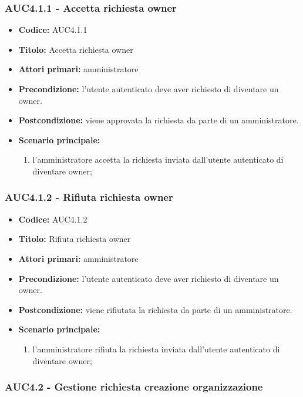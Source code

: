 \documentclass[casi-duso]{subfiles}
\begin{document}
\subsubsection{AUC4.1.1 - Accetta richiesta owner}%
\label{subsub:AUC4.1.1}
\begin{itemize}
  \item \textbf{Codice:} AUC4.1.1
  \item \textbf{Titolo:} Accetta richiesta owner
  \item \textbf{Attori primari:} amministratore
  \item \textbf{Precondizione:} l'utente autenticato deve aver richiesto di diventare un owner.
  \item \textbf{Postcondizione:} viene approvata la richiesta da parte di un amministratore.
  \item \textbf{Scenario principale:}
  \begin{enumerate}
    \item l'amministratore accetta la richiesta inviata dall'utente autenticato di diventare owner;
  \end{enumerate}
\end{itemize}

\subsubsection{AUC4.1.2 - Rifiuta richiesta owner}%
\label{subsub:AUC4.1.2}
\begin{itemize}
  \item \textbf{Codice:} AUC4.1.2
  \item \textbf{Titolo:} Rifiuta richiesta owner
  \item \textbf{Attori primari:} amministratore
  \item \textbf{Precondizione:} l'utente autenticato deve aver richiesto di diventare un owner.
  \item \textbf{Postcondizione:} viene rifiutata la richiesta da parte di un amministratore.
  \item \textbf{Scenario principale:}
  \begin{enumerate}
    \item l'amministratore rifiuta la richiesta inviata dall'utente autenticato di diventare owner;
  \end{enumerate}
\end{itemize}

\subsubsection{AUC4.2 - Gestione richiesta creazione organizzazione}%
\label{subsub:AUC4.2}
\end{document}
